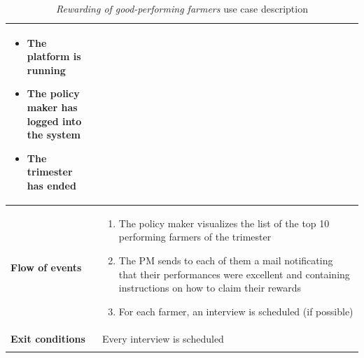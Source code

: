 \documentclass[10pt]{article}
\begin{document}
\begin{enumerate}[label=\textbf{UC\arabic*}]
\begin{longtable}{p{0.26\linewidth}p{0.75\linewidth}}
\begin{itemize}
                \item The platform is running
                \item The policy maker has logged into the system
                \item The trimester has ended
            \end{itemize}\\
            \midrule
            \textbf{Flow of events} & 
            \begin{enumerate}
                \item The policy maker visualizes the list of the top 10 performing farmers of the trimester
                \item The PM sends to each of them a mail notificating that their performances were excellent and containing instructions on how to claim their rewards
                \item For each farmer, an interview is scheduled (if possible)
            \end{enumerate} \\
            \midrule
            \textbf{Exit conditions} & Every interview is scheduled\\
            \midrule
            \bottomrule
            \caption{\emph{Rewarding of good-performing farmers} use case description}
        \end{longtable}
    \newpage
\end{enumerate}
\end{document}
